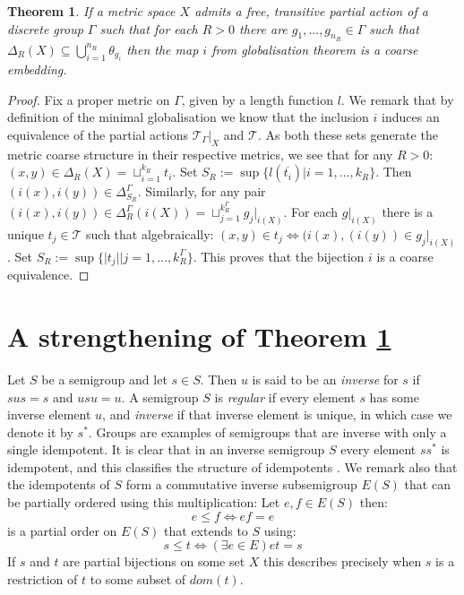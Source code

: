 \documentclass[11pt,a4paper]{amsart}
\theoremstyle{plain}
\newtheorem{theorem}{Theorem}%
\theoremstyle{definition}%
\theoremstyle{remark}%
\begin{document}
\begin{theorem}\label{Thm:Embedding}
If a metric space $X$ admits a free, transitive partial action of a discrete group $\Gamma$ such that for each $R>0$ there are $g_{1},...,g_{n_{R}} \in \Gamma$ such that $\Delta_{R}(X) \subseteq \bigcup_{i=1}^{n_{R}}\theta_{g_{i}}$ then the map $i$ from globalisation theorem is a coarse embedding.
\end{theorem}
\begin{proof}
Fix a proper metric on $\Gamma$, given by a length function $l$. We remark that by definition of the minimal globalisation we know that the inclusion $i$ induces an equivalence of the partial actions $\mathcal{T}_{\Gamma}|_{X}$ and $\mathcal{T}$. As both these sets generate the metric coarse structure in their respective metrics, we see that for any $R>0$: $(x,y)\in \Delta_{R}(X)=\sqcup_{i=1}^{k_{R}}t_{i}$. Set $S_{R}:=\sup \lbrace l(\overline{t_{i}}) | i=1,...,k_{R} \rbrace$. Then $(i(x),i(y))\in \Delta_{S_{R}}^{\Gamma}$. Similarly, for any pair $(i(x),i(y)) \in \Delta^{\Gamma}_{R}(i(X))=\sqcup_{j=1}^{k_{R}^{\Gamma}} g_{j}|_{i(X)}$. For each $g|_{i(X)}$ there is a unique $t_{j}\in \mathcal{T}$ such that algebraically: $(x,y)\in t_{j} \Leftrightarrow (i(x),(i(y)) \in g_{j}|_{i(X)}$. Set $S_{R}:=\sup \lbrace \vert t_{j} \vert | j=1,...,k_{R}^{\Gamma} \rbrace$. This proves that the bijection $i$ is a coarse equivalence. 
\end{proof}

\section{A strengthening of Theorem \ref{Thm:Embedding}}

Let $S$ be a semigroup and let $s \in S$. Then $u$ is said to be an \textit{inverse} for $s$ if $sus=s$ and $usu=u$. A semigroup $S$ is \textit{regular} if every element $s$ has some inverse element $u$, and \textit{inverse} if that inverse element is unique, in which case we denote it by $s^{*}$. Groups are examples of semigroups that are inverse with only a single idempotent. It is clear that in an inverse semigroup $S$ every element $ss^{*}$ is idempotent, and this classifies the structure of idempotents \cite{}. We remark also that the idempotents of $S$ form a commutative inverse subsemigroup $E(S)$ that can be partially ordered using this multiplication: Let $e,f \in E(S)$ then:
\begin{equation*}
e \leq f \Leftrightarrow ef=e
\end{equation*}
is a partial order on $E(S)$ that extends to $S$ using:
\begin{equation*}
s \leq t \Leftrightarrow (\exists e \in E) et=s
\end{equation*}
If $s$ and $t$ are partial bijections on some set $X$ this describes precisely when $s$ is a restriction of $t$ to some subset of $dom(t)$.
\end{document}
